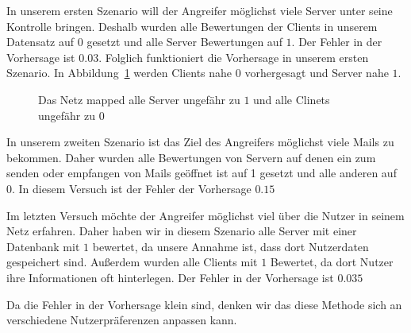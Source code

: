 In unserem ersten Szenario will der Angreifer möglichst viele Server
unter seine Kontrolle bringen. Deshalb wurden alle Bewertungen der
Clients in unserem Datensatz auf $0$ gesetzt und alle Server
Bewertungen auf $1$. Der Fehler in der Vorhersage ist $0.03$. Folglich
funktioniert die Vorhersage in unserem ersten Szenario. In
Abbildung~\ref{fig:predictor} werden Clients nahe $0$ vorhergesagt und Server
nahe $1$.

\begin{figure}
  \centering
  \caption{Das Netz mapped alle Server ungefähr zu $1$ und alle Clinets ungefähr zu $0$}
  \label{fig:predictor}
\end{figure}

In unserem zweiten Szenario ist das Ziel des Angreifers möglichst
viele Mails zu bekommen. Daher wurden alle Bewertungen von Servern
auf denen ein  zum senden oder empfangen von Mails geöffnet ist
auf 1 gesetzt und alle anderen auf 0. In diesem Versuch ist der
Fehler der Vorhersage $0.15$

Im letzten Versuch möchte der Angreifer möglichst viel über die Nutzer
in seinem Netz erfahren. Daher haben wir in diesem Szenario alle
Server mit einer Datenbank mit $1$ bewertet, da unsere Annahme ist,
dass dort Nutzerdaten gespeichert sind. Außerdem wurden alle Clients
mit $1$ Bewertet, da dort Nutzer ihre Informationen oft hinterlegen.
Der Fehler in der Vorhersage ist $0.035$

Da die Fehler in der Vorhersage klein sind, denken wir das diese
Methode sich an verschiedene Nutzerpräferenzen anpassen kann.

